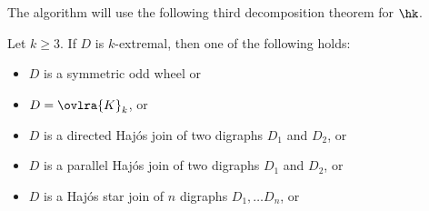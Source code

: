 The algorithm will use the following third decomposition theorem for $\hk$.
\begin{theorem}\label{lem:htk_implies_other_joins}
    Let $k \geq 3$. If $D$ is $k$-extremal, then one of the following holds:
    \begin{itemize}
        \item $D$ is a symmetric odd wheel or
        \item $D = \ovlra{K}_k$, or
        \item $D$ is a directed Haj\'os join of two digraphs $D_1$ and $D_2$, or
        \item $D$ is a parallel Haj\'os join of two digraphs $D_1$ and $D_2$, or
        \item $D$ is a Haj\'os star join of $n$ digraphs $D_1, \dots D_n$, or
    \end{itemize}
\end{theorem}
